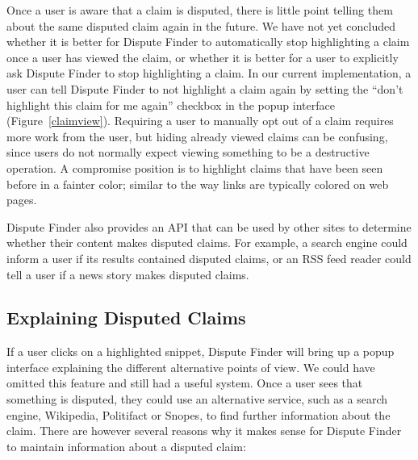 \documentclass{www2010-submission}
\newcommand{\todo}[1]{}
\begin{document}
Once a user is aware that a claim is disputed, there is little point telling them about the same disputed claim again in the future. We have not yet concluded whether it is better for Dispute Finder to automatically stop highlighting a claim once a user has viewed the claim, or whether it is better for a user to explicitly ask Dispute Finder to stop highlighting a claim. In our current implementation, a user can tell Dispute Finder to not highlight a claim again by setting the ``don't highlight this claim for me again'' checkbox in the popup interface (Figure~\ref{claimview}). Requiring a user to manually opt out of a claim requires more work from the user, but hiding already viewed claims can be confusing, since users do not normally expect viewing something to be a destructive operation. A compromise position is to highlight claims that have been seen before in a fainter color; similar to the way links are typically colored on web pages.

\todo{Try using a fainter color}

\todo{Text is wrong in the screenshot}

Dispute Finder also provides an API that can be used by other sites to determine whether their content makes disputed claims. For example, a search engine could inform a user if its results contained disputed claims, or an RSS feed reader could tell a user if a news story makes disputed claims.

\todo{Document API online}
\todo{Change the highlight color to yellow? Auto-adjust highlight color based on background color?}
\todo{Should we automatically adjust the highlight color, based on the background color of the page}
\todo{Discuss previous work on highlighting here, rather than in related work?}


\subsection{Explaining Disputed Claims}

If a user clicks on a highlighted snippet, Dispute Finder will bring up a popup interface explaining the different alternative points of view. We could have omitted this feature and still had a useful system. Once a user sees that something is disputed, they could use an alternative service, such as a search engine, Wikipedia, Politifact or Snopes, to find further information about the claim. There are however several reasons why it makes sense for Dispute Finder to maintain information about a disputed claim:
\end{document}
